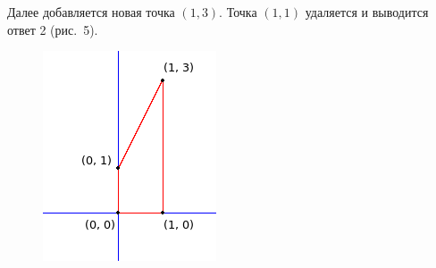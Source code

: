 \newpage
Далее добавляется новая точка $(1, 3)$. Точка $(1, 1)$ удаляется и выводится ответ 2 (рис.~5).

\begin{figure}[ht!]
\begin{center}
\includegraphics[scale=1.0]{images/picture5.png}
\end{center}
\end{figure}

